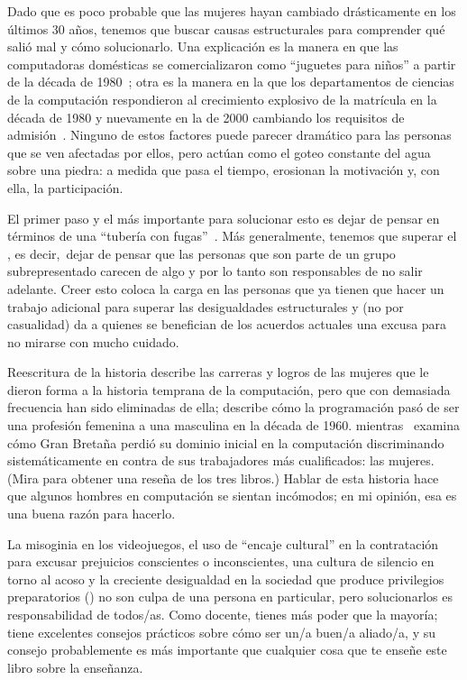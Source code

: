 
Dado que es poco probable que las mujeres hayan cambiado drásticamente en los últimos 30 años,
tenemos que buscar causas estructurales para comprender qué salió mal y cómo solucionarlo.
Una explicación es la manera en que las computadoras domésticas se comercializaron como ``juguetes para niños'' a partir de la década de 1980~\cite{Marg2003};
otra es la manera en la que los departamentos de ciencias de la computación respondieron al crecimiento explosivo de la matrícula
en la década de 1980 y nuevamente en la de 2000
cambiando los requisitos de admisión~\cite{Robe2017}.
Ninguno de estos factores puede parecer dramático para las personas que se ven afectadas por ellos,
pero actúan como el goteo constante del agua sobre una piedra:
a medida que pasa el tiempo, erosionan la motivación y, con ella, la participación.

El primer paso y el más importante para solucionar esto es
dejar de pensar en términos de una ``tubería con fugas''~\cite{Mill2015}.
Más generalmente,
tenemos que superar el ,
es decir,\ dejar de pensar que las personas que son parte de un grupo subrepresentado carecen de algo
y por lo tanto son responsables de no salir adelante.
Creer esto coloca la carga en las personas que ya tienen que hacer un trabajo adicional para superar las desigualdades estructurales
y (no por casualidad) da a quienes se benefician de los acuerdos actuales
una excusa para no mirarse con mucho cuidado.

\begin{aside}{Reescritura de la historia}
  \cite{Abba2012} describe las carreras y logros de
    las mujeres que le dieron forma a la historia temprana de la computación,
    pero que con demasiada frecuencia han sido eliminadas de ella; 
    \cite{Ensm2003,Ensm2012} describe cómo la programación pasó de ser una profesión femenina a una masculina en la década de 1960.
    mientras~\cite{Hick2018} examina cómo Gran Bretaña perdió su dominio inicial en la computación
    discriminando sistemáticamente en contra de sus trabajadores más cualificados:
    las mujeres.
    (Mira \cite{Milt2018} para obtener una reseña de los tres libros.)
    Hablar de esta historia hace que algunos hombres en computación se sientan incómodos;
    en mi opinión,
    esa es una buena razón para hacerlo.
\end{aside}

La misoginia en los videojuegos,
el uso de ``encaje cultural'' en la contratación para excusar prejuicios conscientes o inconscientes,
una cultura de silencio en torno al acoso
y la creciente desigualdad en la sociedad que produce privilegios preparatorios ()
no son culpa de una persona en particular,
pero solucionarlos es responsabilidad de todos/as.
Como docente,
tienes más poder que la mayoría;
tiene excelentes consejos prácticos sobre cómo ser un/a buen/a aliado/a,
y su consejo probablemente es más importante que cualquier cosa que te enseñe este libro sobre la enseñanza.

